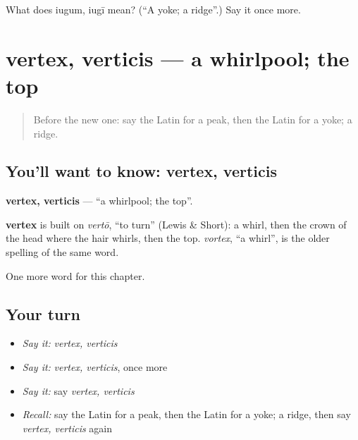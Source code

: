 \begin{tcolorbox}[breakable,colback=teal!4,colframe=teal!35!black,title={Before you move on}]
What does iugum, iugī mean? (\textquotedblleft{}A yoke; a ridge\textquotedblright{}.) Say it once more.
\end{tcolorbox}
\section[vertex, verticis]{vertex, verticis — a whirlpool; the top}

\label{lesson:LA-C228-vertex}



\begin{quote}
Before the new one: say the Latin for a peak, then the Latin for a yoke; a ridge.
\end{quote}

\subsection*{You'll want to know: vertex, verticis}
\textbf{vertex, verticis} — \textquotedblleft{}a whirlpool; the top\textquotedblright{}.

\begin{cousinweb}
\textbf{vertex} is built on \emph{vertō}, \textquotedblleft{}to turn\textquotedblright{} (Lewis \& Short): a whirl, then the crown of the head where the hair whirls, then the top. \emph{vortex}, \textquotedblleft{}a whirl\textquotedblright{}, is the older spelling of the same word.
\end{cousinweb}

\begin{grammarlens}[title={What you've built}]
One more word for this chapter.
\end{grammarlens}

\subsection*{Your turn}
\begin{itemize}
\raggedright
  \item \emph{Say it:} \emph{vertex, verticis}
  \item \emph{Say it:} \emph{vertex, verticis}, once more
  \item \emph{Say it:} say \emph{vertex, verticis}
  \item \emph{Recall:} say the Latin for a peak, then the Latin for a yoke; a ridge, then say \emph{vertex, verticis} again
\end{itemize}

